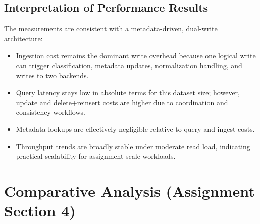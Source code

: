 \documentclass[12pt,a4paper]{article}
\begin{document}
\subsection{Interpretation of Performance Results}
The measurements are consistent with a metadata-driven, dual-write architecture:
\begin{itemize}
	\item Ingestion cost remains the dominant write overhead because one logical write can trigger classification, metadata updates, normalization handling, and writes to two backends.
	\item Query latency stays low in absolute terms for this dataset size; however, update and delete+reinsert costs are higher due to coordination and consistency workflows.
	\item Metadata lookups are effectively negligible relative to query and ingest costs.
	\item Throughput trends are broadly stable under moderate read load, indicating practical scalability for assignment-scale workloads.
\end{itemize}

\section{Comparative Analysis (Assignment Section 4)}
\end{document}

